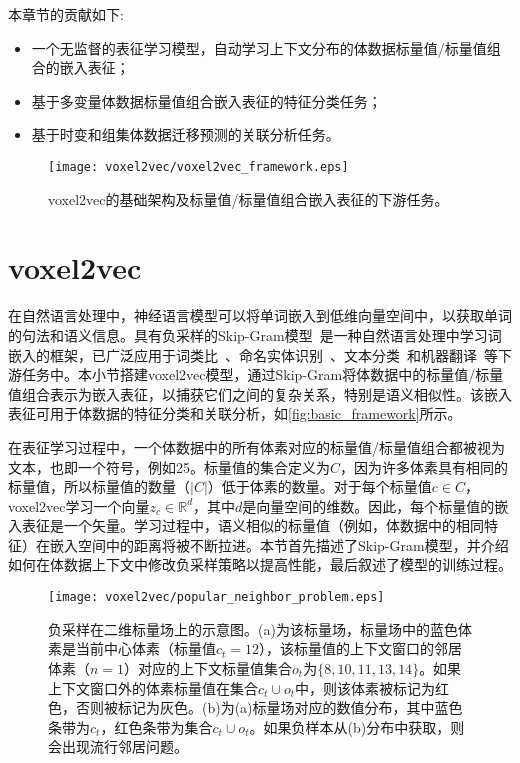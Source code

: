 本章节的贡献如下:
\begin{itemize}
\item 一个无监督的表征学习模型，自动学习上下文分布的体数据标量值/标量值组合的嵌入表征；
\item 基于多变量体数据标量值组合嵌入表征的特征分类任务；
\item 基于时变和组集体数据迁移预测的关联分析任务。
\end{itemize}

\begin{figure}[htbp]
	\centering
	\texttt{[image: voxel2vec/voxel2vec\_framework.eps]}
	\caption{
        voxel2vec的基础架构及标量值/标量值组合嵌入表征的下游任务。
	}\label{fig:basic_framework}
\end{figure}

\section{voxel2vec}

在自然语言处理中，神经语言模型可以将单词嵌入到低维向量空间中，以获取单词的句法和语义信息。具有负采样的Skip-Gram模型~\cite{MIKOLOV:2013:DRO}是一种自然语言处理中学习词嵌入的框架，已广泛应用于词类比~\cite{BOJANOWSKI:2017:EWV}、命名实体识别~\cite{ZIRIKLY:2015:NER}、文本分类~\cite{LAI:2015:RCN}和机器翻译~\cite{ZHANG:2014:BPE}等下游任务中。本小节搭建voxel2vec模型，通过Skip-Gram将体数据中的标量值/标量值组合表示为嵌入表征，以捕获它们之间的复杂关系，特别是语义相似性。该嵌入表征可用于体数据的特征分类和关联分析，如\autoref{fig:basic_framework}所示。

在表征学习过程中，一个体数据中的所有体素对应的标量值/标量值组合都被视为文本，也即一个符号，例如25。标量值的集合定义为$C$，因为许多体素具有相同的标量值，所以标量值的数量（$|C|$）低于体素的数量。对于每个标量值$c \in C$，voxel2vec学习一个向量$z_c \in \mathbb{R}^d$，其中$d$是向量空间的维数。因此，每个标量值的嵌入表征是一个矢量。学习过程中，语义相似的标量值（例如，体数据中的相同特征）在嵌入空间中的距离将被不断拉进。本节首先描述了Skip-Gram模型，并介绍如何在体数据上下文中修改负采样策略以提高性能，最后叙述了模型的训练过程。

\begin{figure}[htbp]
    \centering
    \texttt{[image: voxel2vec/popular\_neighbor\_problem.eps]}
    \caption{负采样在二维标量场上的示意图。(a)为该标量场，标量场中的蓝色体素是当前中心体素（标量值$c_t=12$），该标量值的上下文窗口的邻居体素（$n=1$）对应的上下文标量值集合$o_t$为$\{8,10,11,13,14\}$。如果上下文窗口外的体素标量值在集合$c_t \cup o_t$中，则该体素被标记为红色，否则被标记为灰色。(b)为(a)标量场对应的数值分布，其中蓝色条带为$c_t$，红色条带为集合$c_t \cup o_t$。如果负样本从(b)分布中获取，则会出现流行邻居问题。
    }\label{fig:optimization_2}
  \end{figure}

